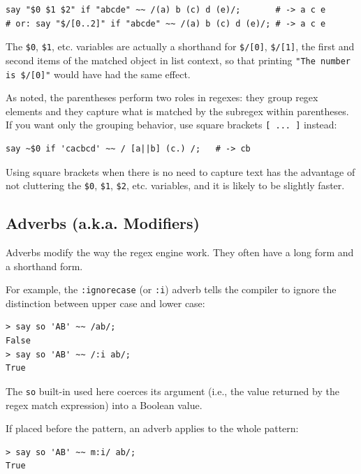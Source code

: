 \begin{verbatim}
say "$0 $1 $2" if "abcde" ~~ /(a) b (c) d (e)/;       # -> a c e
# or: say "$/[0..2]" if "abcde" ~~ /(a) b (c) d (e)/; # -> a c e
\end{verbatim}
%

The \verb'$0', \verb'$1', etc. variables are actually a 
shorthand for \verb'$/[0]', \verb'$/[1]', the first and 
second items of the matched 
object in list context, so that printing  
\verb'"The number is $/[0]"' would have had the same 
effect. 

As noted, the parentheses perform two roles in regexes: 
they group regex elements and they capture what is matched 
by the subregex within parentheses. If you want only the 
grouping behavior, use square brackets
\verb'[ ... ]' instead:

\begin{verbatim}
say ~$0 if 'cacbcd' ~~ / [a||b] (c.) /;   # -> cb
\end{verbatim}
%

Using square brackets when there is no need to capture 
text has the advantage of not cluttering the \verb'$0', 
\verb'$1', \verb'$2', etc. variables, and it is likely 
to be slightly faster.

\subsection{Adverbs (a.k.a. Modifiers)}
\label{adverb}

Adverbs modify the way the regex engine work. They often have a 
long form and a shorthand form.

For example, the \verb':ignorecase' (or \verb':i') adverb 
tells the compiler to ignore the distinction between upper 
case and lower case: 

\begin{verbatim}
> say so 'AB' ~~ /ab/;
False
> say so 'AB' ~~ /:i ab/;
True
\end{verbatim}
%

The \verb'so' built-in used here coerces its argument (i.e., 
the value returned by the regex match expression) into 
a Boolean value. 

If placed before the pattern, an adverb applies to the 
whole pattern:

\begin{verbatim}
> say so 'AB' ~~ m:i/ ab/;
True
\end{verbatim}
%

